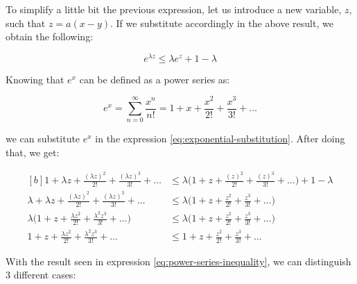 \documentclass[11pt,a4paper]{article}
\begin{document}
To simplify a little bit the previous expression, let us introduce a new variable, $z$,
such that $z = a(x - y)$. If we substitute accordingly in the above result, we obtain the
following:

\begin{equation}
  \label{eq:exponential-substitution}
  e^{\lambda z} \leq \lambda e^{z} + 1 - \lambda
\end{equation}

Knowing that $e^x$ can be defined as a power series as:

$$e^x = \sum_{n=0}^\infty \frac{x^n}{n!} = 1 + x + \frac{x^2}{2!} + \frac{x^3}{3!} + \dots$$

\noindent we can substitute $e^x$ in the expression \eqref{eq:exponential-substitution}. After
doing that, we get:

\begin{equation}
  \label{eq:power-series-inequality}
  \begin{aligned}[b]
    1 + \lambda z + \frac{(\lambda z)^2}{2!} + \frac{(\lambda z)^3}{3!} + \dots &\leq
    \lambda \bigg( 1 + z + \frac{(z)^2}{2!} + \frac{(z)^3}{3!} + \dots \bigg) + 1 - \lambda \\
    \lambda + \lambda z + \frac{(\lambda z)^2}{2!} + \frac{(\lambda z)^3}{3!} + \dots &\leq
    \lambda \bigg( 1 + z + \frac{z^2}{2!} + \frac{z^3}{3!} + \dots \bigg) \\
    \lambda \bigg( 1 + z + \frac{\lambda z^2}{2!} + \frac{\lambda^2 z^3}{3!} + \dots \bigg) &\leq
    \lambda \bigg( 1 + z + \frac{z^2}{2!} + \frac{z^3}{3!} + \dots \bigg) \\
    1 + z + \frac{\lambda z^2}{2!} + \frac{\lambda^2 z^3}{3!} + \dots &\leq
    1 + z + \frac{z^2}{2!} + \frac{z^3}{3!} + \dots
  \end{aligned}
\end{equation}

With the result seen in expression \eqref{eq:power-series-inequality}, we can distinguish
3 different cases:
\end{document}
